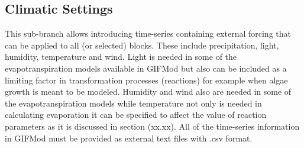 \subsection{Climatic Settings}
This sub-branch allows introducing time-series containing external forcing that can be applied to all (or selected) blocks. These include precipitation, light, humidity, temperature and wind. Light is needed in some of the evapotranspiration models available in GIFMod but also can be included as a limiting factor in transformation processes (reactions) for example when algae growth is meant to be modeled. Humidity and wind also are needed in some of the evapotranspiration models while temperature not only is needed in calculating evaporation it can be specified to affect the value of reaction parameters as it is discussed in section (xx.xx). All of the time-series information in GIFMod must be provided as external text files with .csv format.
